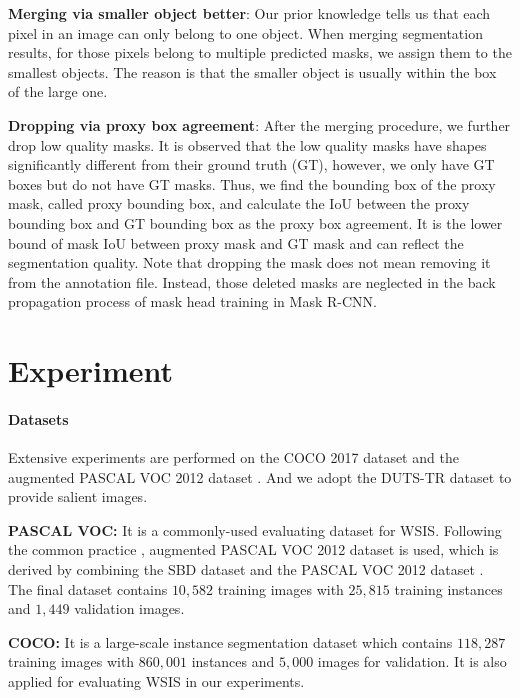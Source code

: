 \documentclass[final]{cvpr}
\begin{document}
\textbf{Merging via smaller object better}:
Our prior knowledge tells us that each pixel in an image can only belong to one object. When merging segmentation results, for those pixels belong to multiple predicted masks, we assign them to the smallest objects. The reason is that the smaller object is usually within the box of the large one. 






\textbf{Dropping via proxy box agreement}: After the merging procedure, we further drop low quality masks. It is observed that the low quality masks have shapes significantly different from their ground truth (GT), however, we only have GT boxes but do not have GT masks. Thus, we find the bounding box of the proxy mask, called proxy bounding box, and calculate the IoU between the proxy bounding box and GT bounding box as the proxy box agreement. It is the lower bound of mask IoU between proxy mask and GT mask and can reflect the segmentation quality. Note that dropping the mask does not mean removing it from the annotation file. Instead, those deleted masks are neglected in the back propagation process of mask head training in Mask R-CNN.

\vspace{-1mm}
\section{Experiment}

\paragraph{Datasets}

Extensive experiments are performed on the COCO 2017 dataset \cite{lin2014microsoft} and the augmented PASCAL VOC 2012 dataset \cite{hariharan2011semantic}. And we adopt the DUTS-TR dataset \cite{wang2017learning} to provide salient images.

\textbf{PASCAL VOC:} It is a commonly-used evaluating dataset for WSIS. Following the common practice \cite{khoreva2017simple}, augmented PASCAL VOC 2012 dataset is used, which is derived by combining the SBD dataset \cite{hariharan2011semantic} and the PASCAL VOC 2012 dataset \cite{everingham2015pascal}. The final dataset contains $10,582$ training images with $25,815$ training instances and $1,449$ validation images.

\textbf{COCO:} It is a large-scale instance segmentation dataset which contains $118,287$ training images with $860,001$ instances and $5,000$ images for validation. It is also applied for evaluating WSIS in our experiments.
\end{document}
